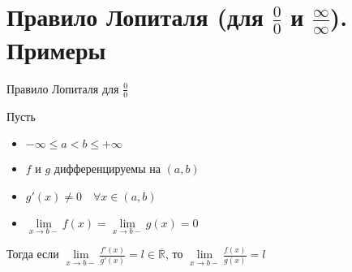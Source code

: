 \section{Правило Лопиталя (для $\frac{0}{0}$ и $\frac{\infty}{\infty}$). Примеры \href{https://youtu.be/au9-34CerJM?t=278}{\Walley}}

\begin{theorem-non} 
    Правило Лопиталя для $\frac{0}{0}$

    Пусть 
    \begin{itemize}
        \item $-\infty \leq a < b \leq +\infty$
        \item $f$ и $g$ дифференцируемы на $(a, b)$
        \item $g'(x) \neq 0 \quad \forall x \in (a, b)$
        \item $\lim\limits_{x \rightarrow b-} f(x) = \lim\limits_{x \rightarrow b-} g(x) = 0$
    \end{itemize}
    Тогда если $\lim\limits_{x \rightarrow b-}\frac{f'(x)}{g'(x)} = l \in \overline{\mathbb{R}}$, 
    то $\lim\limits_{x \rightarrow b-}\frac{f(x)}{g(x)} = l$
\end{theorem-non}
